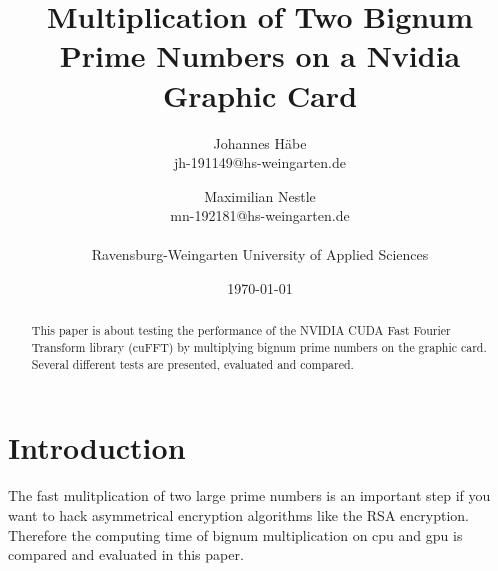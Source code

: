 \documentclass[12pt,a4paper]{article}
\title{Multiplication of Two Bignum Prime Numbers on a Nvidia Graphic Card}
\author{Johannes H\"abe  \\
	jh-191149@hs-weingarten.de
	\and 
	Maximilian Nestle \\
	mn-192181@hs-weingarten.de \\\\
	Ravensburg-Weingarten University of Applied Sciences
	}
\date{\today}
\begin{document}
\maketitle
%
\begin{abstract}
This paper is about testing the performance of the NVIDIA CUDA Fast Fourier Transform library (cuFFT) by multiplying bignum prime numbers on the graphic card. Several different tests are presented, evaluated and compared.
\end{abstract}

\section{Introduction}
The fast mulitplication of two large prime numbers is an important step if you want to hack asymmetrical encryption algorithms like the RSA encryption. Therefore the computing time of bignum multiplication on cpu and gpu is compared and evaluated in this paper.
\newpage

\end{document}
